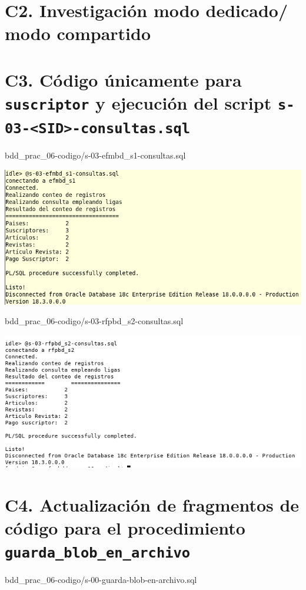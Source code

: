 \documentclass{article}
\newcommand{\codedir}{bdd_prac_06-codigo}
\begin{document}
\section*{C2. Investigación modo dedicado/ modo compartido }


\section*{C3. Código únicamente para \texttt{suscriptor} y ejecución del 
  script \texttt{s-03-<SID>-consultas.sql}}


  {\codedir/s-03-efmbd_s1-consultas.sql}

  \includegraphics[width=0.8\linewidth]{efm_c3}


  {\codedir/s-03-rfpbd_s2-consultas.sql}

  \includegraphics[width=0.8\linewidth]{rfp_c3}

\section*{C4. Actualización de fragmentos de código para el procedimiento 
  \texttt{guarda\_blob\_en\_archivo}}

  
  {\codedir/s-00-guarda-blob-en-archivo.sql}
\end{document}
